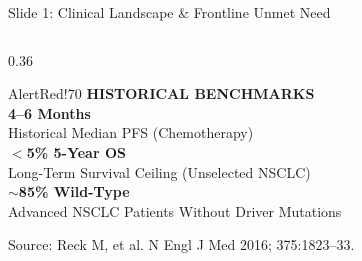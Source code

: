 \documentclass[aspectratio=169,10pt]{beamer}
\begin{document}
\begin{frame}{Slide 1: Clinical Landscape \& Frontline Unmet Need}
\begin{columns}[T]
  \begin{column}{0.36\textwidth}
    \begin{statcard}{AlertRed!70}
      \centering
      {\scriptsize\textbf{\color{AlertRed}HISTORICAL BENCHMARKS}}\\[4pt]
      {\large\textbf{\color{TextDark}4--6 Months}}\\[-1pt]
      {\tiny\color{TextMuted} Historical Median PFS (Chemotherapy)}\\[5pt]
      {\large\textbf{\color{TextDark}$<$5\% 5-Year OS}}\\[-1pt]
      {\tiny\color{TextMuted} Long-Term Survival Ceiling (Unselected NSCLC)}\\[5pt]
      {\large\textbf{\color{TextDark}$\sim$85\% Wild-Type}}\\[-1pt]
      {\tiny\color{TextMuted} Advanced NSCLC Patients Without Driver Mutations}
    \end{statcard}
    \vskip 4pt
    {\raggedleft\tiny\color{TextMuted}Source: Reck M, et al. N Engl J Med 2016; 375:1823--33.\par}
  \end{column}
\end{columns}
\end{frame}
\end{document}
